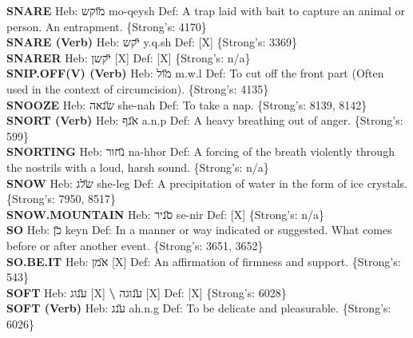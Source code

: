 {\textbf{SNARE} Heb: {\large\H מוקש} mo-qeysh Def: A trap laid with bait to capture an animal or person. An entrapment. \{Strong's: 4170\}\hfill{}\\

\textbf{SNARE (Verb)} Heb: {\large\H יקש} y.q.sh Def: {[}X{]} \{Strong's: 3369\}\hfill{}\\

\textbf{SNARER} Heb: {\large\H יקשן} {[}X{]} Def: {[}X{]} \{Strong's: n/a\}\hfill{}\\

\textbf{SNIP.OFF(V) (Verb)} Heb: {\large\H מול} m.w.l Def: To cut off the front part (Often used in the context of circumcision). \{Strong's: 4135\}\hfill{}\\

\textbf{SNOOZE} Heb: {\large\H שנאה} she-nah Def: To take a nap. \{Strong's: 8139, 8142\}\hfill{}\\

\textbf{SNORT (Verb)} Heb: {\large\H אנף} a.n.p Def: A heavy breathing out of anger. \{Strong's: 599\}\hfill{}\\

\textbf{SNORTING} Heb: {\large\H נחור} na-hhor Def: A forcing of the breath violently through the nostrils with a loud, harsh sound. \{Strong's: n/a\}\hfill{}\\

\textbf{SNOW} Heb: {\large\H שלג} she-leg Def: A precipitation of water in the form of ice crystals. \{Strong's: 7950, 8517\}\hfill{}\\

\textbf{SNOW.MOUNTAIN} Heb: {\large\H סניר} se-nir Def: {[}X{]} \{Strong's: n/a\}\hfill{}\\

\textbf{SO} Heb: {\large\H כן} keyn Def: In a manner or way indicated or suggested. What comes before or after another event. \{Strong's: 3651, 3652\}\hfill{}\\

\textbf{SO.BE.IT} Heb: {\large\H אמן} {[}X{]} Def: An affirmation of firmness and support. \{Strong's: 543\}\hfill{}\\

\textbf{SOFT} Heb: {\large\H ענוג} {[}X{]} \textbf{\textbackslash{}} {\large\H ענוגה} {[}X{]} Def: {[}X{]} \{Strong's: 6028\}\hfill{}\\

\textbf{SOFT (Verb)} Heb: {\large\H ענג} ah.n.g Def: To be delicate and pleasurable. \{Strong's: 6026\}\hfill{}\\

}
